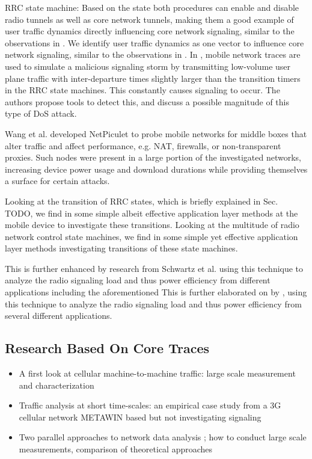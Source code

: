\gls{RRC} state machine:
Based on the state both procedures can enable and disable radio tunnels as well as core network tunnels, making them a good example of user traffic dynamics directly influencing core network signaling, similar to the observations in \cite{lee2007detection}. 
We identify user traffic dynamics as one vector to influence core network signaling, similar to the observations in \cite{lee2007detection}.
In \cite{lee2007detection}, mobile network traces are used to simulate a malicious signaling storm by transmitting low-volume user plane traffic with inter-departure times slightly larger than the transition timers in the \gls{RRC} state machines. This constantly causes signaling to occur. The authors propose tools to detect this, and discuss a possible magnitude of this type of \gls{DoS} attack.

 
Wang et al.\cite{sigcomm11middleboxes} developed NetPiculet to probe mobile networks for middle boxes that alter traffic and affect performance, e.g. NAT, firewalls, or non-transparent proxies. Such nodes were present in a large portion of the investigated networks, increasing device power usage and download durations while providing themselves a surface for certain attacks.


Looking at the transition of \gls{RRC} states, which is briefly explained in Sec. TODO, we find in \cite{5360763} some simple albeit effective application layer methods at the mobile device to investigate these transitions. 
Looking at the multitude of radio network control state machines, we find in \cite{5360763} some simple yet effective application layer methods investigating transitions of these state machines. 


This is further enhanced by research from Schwartz et al.\cite{schwartz2013angrybirds} using this technique to analyze the radio signaling load and thus power efficiency from different applications including the aforementioned
This is further elaborated on by \cite{schwartz2013angrybirds}, using this technique to analyze the radio signaling load and thus power efficiency from several different applications.


\subsection{Research Based On Core Traces}

\begin{itemize}
	\item A first look at cellular machine-to-machine traffic: large scale measurement and characterization \cite{Shafiq:2012:FLC:2254756.2254767}
	\item Traffic analysis at short time-scales: an empirical case study from a 3G cellular network \cite{4570772} METAWIN based but not investigating signaling
	\item Two parallel approaches to network data analysis \cite{baer2011two}; how to conduct large scale measurements, comparison of theoretical approaches
\end{itemize}

